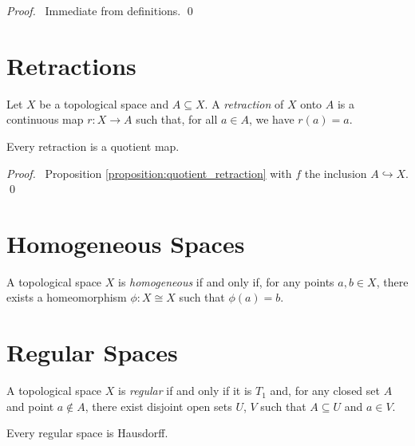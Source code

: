 \begin{proof}
    \pf\ Immediate from definitions. \qed
\end{proof}

\section{Retractions}

\begin{definition}[Retraction]
    Let $X$ be a topological space and $A \subseteq X$. A \emph{retraction} of $X$ onto $A$ is a continuous map $r : X \rightarrow A$ such that, for all $a \in A$,
    we have $r(a) = a$.    
\end{definition}

\begin{proposition}
    Every retraction is a quotient map.
\end{proposition}

\begin{proof}
    \pf\ Proposition \ref{proposition:quotient_retraction} with $f$ the inclusion $A \hookrightarrow X$. \qed
\end{proof}

\section{Homogeneous Spaces}

\begin{definition}[Homogeneous]
    A topological space $X$ is \emph{homogeneous} if and only if, for any
    points $a, b \in X$, there exists a homeomorphism $\phi : X \cong X$
    such that $\phi(a) = b$.
\end{definition}

\section{Regular Spaces}

\begin{definition}
    A topological space $X$ is \emph{regular} if and only if it is $T_1$ and, for any closed set $A$ and point $a \notin A$, there exist disjoint open sets $U$, $V$ such that
    $A \subseteq U$ and $a \in V$.    
\end{definition}

\begin{proposition}
    Every regular space is Hausdorff.
\end{proposition}

